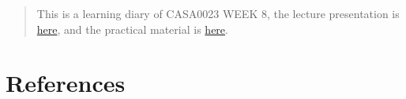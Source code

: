 \documentclass[
  letterpaper,
  DIV=11,
  numbers=noendperiod]{scrreprt}
\newlength{\cslhangindent}
\newlength{\cslentryspacingunit} %
\newenvironment{CSLReferences}[2] %
 {%
  \setlength{\parindent}{0pt}
  \ifodd #1
  \let\oldpar\par
  \def\par{\hangindent=\cslhangindent\oldpar}
  \fi
  \setlength{\parskip}{#2\cslentryspacingunit}
 }%
 {}
\begin{document}
\begin{quote}
This is a learning diary of CASA0023 WEEK 8, the lecture presentation is
\href{https://andrewmaclachlan.github.io/CASA0023-lecture-8/\#1}{here},
and the practical material is
\href{https://andrewmaclachlan.github.io/CASA0023/8_temperature.html}{here}.
\end{quote}


\hypertarget{references}{%
\chapter*{\texorpdfstring{\textbf{References}}{References}}\label{references}}

\hypertarget{refs}{}
\begin{CSLReferences}{0}{0}
\end{CSLReferences}
\end{document}
